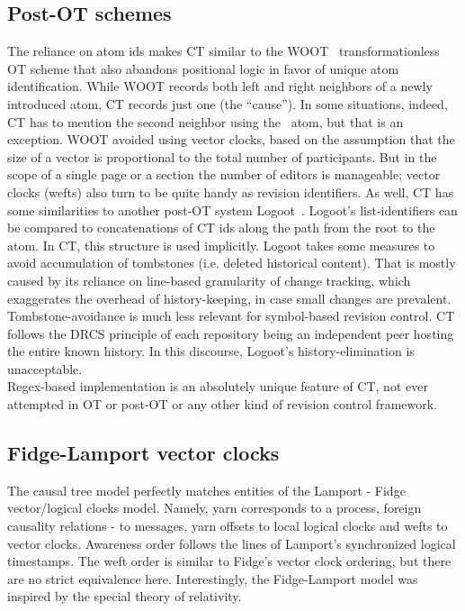 \documentclass{acm_proc_article-sp}
\begin{document}
\subsection{Post-OT schemes}
The reliance on atom ids makes CT similar to the WOOT~\cite{woot} transformationless OT scheme that also abandons positional logic in favor of unique atom identification.
While WOOT records both left and right neighbors of a newly introduced atom, CT records just one (the ``cause''). 
In some situations, indeed, CT has to mention the second neighbor using the \zero ~atom, but that is an exception.
WOOT avoided using vector clocks, based on the assumption that the size of a vector is proportional to the total number of participants.
But in the scope of a single page or a section the number of editors is manageable; vector clocks (wefts) also turn to be quite handy as revision identifiers.
As well, CT has some similarities to another post-OT system Logoot~\cite{logoot}.
Logoot's list-identifiers can be compared to concatenations of CT ids along the path from the root to the atom.
In CT, this structure is used implicitly.
Logoot takes some measures to avoid accumulation of tombstones (i.e. deleted historical content). That is mostly caused by its reliance on line-based granularity of change tracking, which exaggerates the overhead of history-keeping, in case small changes are prevalent.
Tombstone-avoidance is much less relevant for symbol-based revision control.
CT follows the DRCS principle of each repository being an independent peer hosting the entire known history.
In this discourse, Logoot's history-elimination is unacceptable. \\
Regex-based implementation is an absolutely unique feature of CT, not ever attempted in OT or post-OT or any other kind of revision control framework.

\subsection{Fidge-Lamport vector clocks} \label{sec:lamport}

The causal tree model perfectly matches entities of the Lamport - Fidge~\cite{lamport,fidge} vector/logical clocks model.
Namely, yarn corresponds to a process, foreign causality relations - to messages, yarn offsets to local logical clocks and wefts to vector clocks. 
Awareness order follows the lines of Lamport's synchronized logical timestamps.
The weft order is similar to Fidge's vector clock ordering, but there are no strict equivalence here.
Interestingly, the Fidge-Lamport model was inspired by the special theory of relativity.
\end{document}
